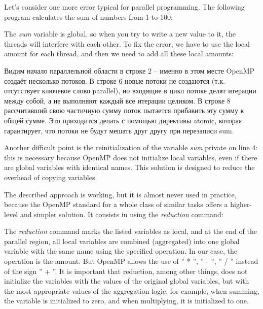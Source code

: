 {	\par Let's consider one more error typical for parallel programming. The following program calculates the sum of numbers from 1 to 100:
	\begin{figure}[H]
		
	\end{figure}
	\par The \textit{sum} variable is global, so when you try to write a new value to it, the threads will interfere with each other. To fix the error, we have to use the local amount for each thread, and then we need to add all these local amounts:
	\begin{figure}[H]
		
	\end{figure}
	Видим начало параллельной области в строке 2 – именно в этом месте OpenMP создаёт несколько потоков. В строке 6 новые потоки не создаются (т.к. отсутствует ключевое слово parallel), но входящие в цикл потоке делят итерации между собой, а не выполняют каждый все итерации целиком. В строке 8 рассчитавший свою частичную сумму поток пытается прибавить эту сумму к общей сумме. Это приходится делать с помощью директивы atomic, которая гарантирует, что потоки не будут мешать друг другу при перезаписи sum. 
	\par Another difficult point is the reinitialization of the variable \textit{sum} \textunderscore private on line 4: this is necessary because OpenMP does not initialize local variables, even if there are global variables with identical names. This solution is designed to reduce the overhead of copying variables.
	\par The described approach is working, but it is almost never used in practice, because the OpenMP standard for a whole class of similar tasks offers a higher-level and simpler solution. It consists in using the \textit{reduction} command:
	\begin{figure}[H]
		
	\end{figure}
	\par The \textit{reduction} command marks the listed variables as local, and at the end of the parallel region, all local variables are combined (aggregated) into one global variable with the same name using the specified operation. In our case, the operation is the amount. But OpenMP allows the use of '' * '', '' - '', '' / '' instead of the sign '' + ''. It is important that reduction, among other things, does not initialize the variables with the values of the original global variables, but with the most appropriate values of the aggregation logic: for example, when summing, the variable is initialized to zero, and when multiplying, it is initialized to one.
}
